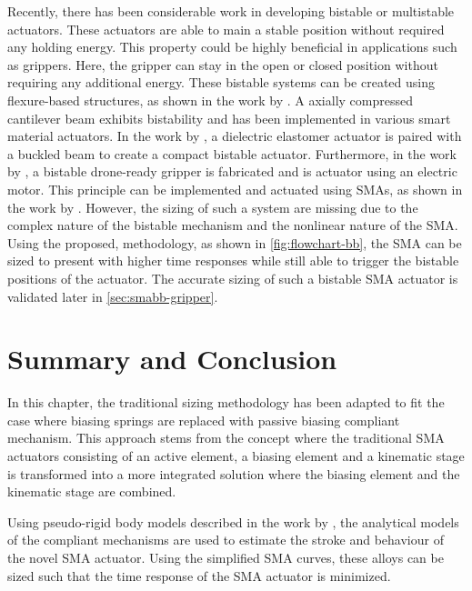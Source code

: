 Recently, there has been considerable work in developing bistable or multistable actuators. These actuators are able to main a stable position without required any holding energy. This property could be highly beneficial in applications such as grippers. Here, the gripper can stay in the open or closed position without requiring any additional energy. These bistable systems can be created using flexure-based structures, as shown in the work by \cite{jinqiuCurvedbeamBistableMechanism2004}. A axially compressed cantilever beam exhibits bistability and has been implemented in various smart material actuators. In the work by \cite{chouinardBistableAntagonisticDielectric2012}, a dielectric elastomer actuator is paired with a buckled beam to create a compact bistable actuator. Furthermore, in the work by \cite{zhangCompliantBistableGrippers2020}, a bistable drone-ready gripper is fabricated and is actuator using an electric motor. This principle can be implemented and actuated using SMAs, as shown in the work by \cite{welschVacuumGripperSystem2018}. However, the sizing of such a system are missing due to the complex nature of the bistable mechanism and the nonlinear nature of the SMA. Using the proposed, methodology, as shown in \cref{fig:flowchart-bb}, the SMA can be sized to present with higher time responses while still able to trigger the bistable positions of the actuator. The accurate sizing of such a bistable SMA actuator is validated later in \cref{sec:smabb-gripper}.

\newpage


\section{Summary and Conclusion}
In this chapter, the traditional sizing methodology has been adapted to fit the case where biasing springs are replaced with passive biasing compliant mechanism. This approach stems from the concept where the traditional SMA actuators consisting of an active element, a biasing element and a kinematic stage is transformed into a more integrated solution where the biasing element and the kinematic stage are combined.

Using pseudo-rigid body models described in the work by \cite{heneinConceptionStructuresArticulees2005}, the analytical models of the compliant mechanisms are used to estimate the stroke and behaviour of the novel SMA actuator. Using the simplified SMA curves, these alloys can be sized such that the time response of the SMA actuator is minimized.

